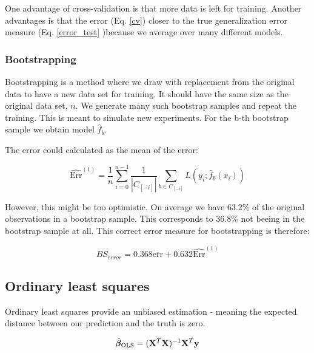 One advantage of cross-validation is that more data is left for training. Another advantages is that the error (Eq. \ref{cv}) closer to the true generalization error measure (Eq. \ref{error_test} )because we average over many different models.  


\subsubsection{Bootstrapping}
Bootstrapping is a method where we draw with replacement from the original data to have a new data set for training. It should have the same size as the original data set, $n$. We generate many such bootstrap samples and repeat the training. 
This is meant to simulate new experiments. 
For the b-th bootstrap sample we obtain model $\hat{f}_b$. 

The error could calculated as the mean of the error:

\begin{equation}
    \widehat{\text{Err}}^{(1)} = \frac{1}{n} \sum_{i=0}^{n-1} \frac{1}{|C_{[-i]}|} \sum_{b \in C_{[-i]}} L\left(y_i; \hat{f}_b(x_i)\right)
\end{equation}

However, this might be too optimistic.  On average we have 63.2\% of the original observations in a bootstrap sample. This corresponds to 36.8\% not beeing in the bootstrap sample at all.  This correct error measure for bootstrapping is therefore: 

\begin{equation}
    BS_{error} = 0.368 \overline{\text{err}} + 0.632 \widehat{\text{Err}}^{(1)}
\end{equation}


\subsection{Ordinary least squares}
Ordinary least squares provide an unbiased estimation - meaning the expected distance between our prediction and the truth is zero. 

\begin{equation}\label{betaols}
    \hat{\boldsymbol{\beta}}_{\text{OLS}} = (\mathbf{X}^T\mathbf{X})^{-1}\mathbf{X}^T\mathbf{y}
\end{equation}


